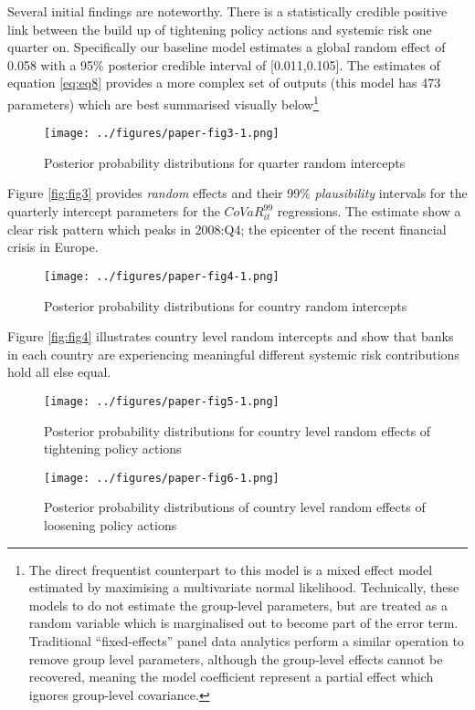 \documentclass[
  10pt,
]{article}
\begin{document}
Several initial findings are noteworthy. There is a statistically
credible positive link between the build up of tightening policy actions
and systemic risk one quarter on. Specifically our baseline model
estimates a global random effect of 0.058 with a 95\% posterior credible
interval of {[}0.011,0.105{]}. The estimates of equation \ref{eq:eq8}
provides a more complex set of outputs (this model has 473 parameters)
which are best summarised visually below\footnote{The direct frequentist
  counterpart to this model is a mixed effect model estimated by
  maximising a multivariate normal likelihood. Technically, these models
  to do not estimate the group-level parameters, but are treated as a
  random variable which is marginalised out to become part of the error
  term. Traditional ``fixed-effects'' panel data analytics perform a
  similar operation to remove group level parameters, although the
  group-level effects cannot be recovered, meaning the model coefficient
  represent a partial effect which ignores group-level covariance.}

\begin{figure}
\centering
\texttt{[image: ../figures/paper-fig3-1.png]}
\caption{Posterior probability distributions for quarter random
intercepts}
\end{figure}

Figure \ref{fig:fig3} provides \emph{random} effects and their 99\%
\emph{plausibility} intervals for the quarterly intercept parameters for
the \(CoVaR^{99}_{it}\) regressions. The estimate show a clear risk
pattern which peaks in 2008:Q4; the epicenter of the recent financial
crisis in Europe.

\begin{figure}
\centering
\texttt{[image: ../figures/paper-fig4-1.png]}
\caption{Posterior probability distributions for country random
intercepts}
\end{figure}

Figure \ref{fig:fig4} illustrates country level random intercepts and
show that banks in each country are experiencing meaningful different
systemic risk contributions hold all else equal.

\begin{figure}
\centering
\texttt{[image: ../figures/paper-fig5-1.png]}
\caption{Posterior probability distributions for country level random
effects of tightening policy actions}
\end{figure}

\begin{figure}
\centering
\texttt{[image: ../figures/paper-fig6-1.png]}
\caption{Posterior probability distributions of country level random
effects of loosening policy actions}
\end{figure}
\end{document}
